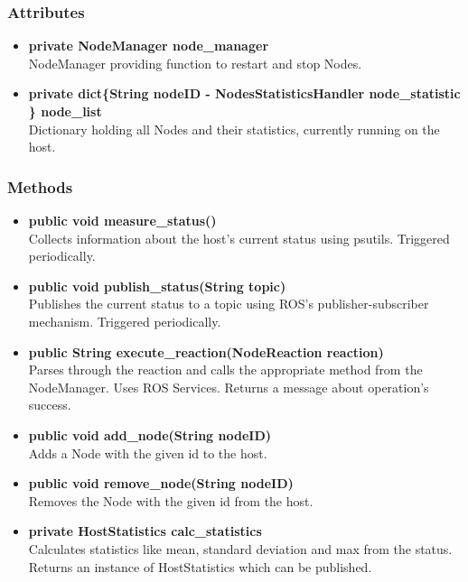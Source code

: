 \subsubsection{Attributes}
\begin{itemize}
	\item \textbf{private NodeManager node\_manager}\\
			NodeManager providing function to restart and stop Nodes.
	\item \textbf{private  dict\{String nodeID  - NodesStatisticsHandler node\_statistic  \} node\_list}\\
			Dictionary holding all Nodes and their statistics, currently running on the host.
\end{itemize}

\subsubsection{Methods}
\begin{itemize}
	\item \textbf{public void measure\_status()}\\
			Collects information about the host's current status using psutils.
			Triggered periodically.
	\item \textbf{public void publish\_status(String topic)}\\
			Publishes the current status to a topic using ROS's publisher-subscriber mechanism.
			Triggered periodically.
	\item \textbf{public String execute\_reaction(NodeReaction reaction)}\\
			Parses through the reaction and calls the appropriate method from the NodeManager. Uses ROS Services.
			Returns a message about operation's success.
	\item \textbf{public void add\_node(String nodeID)}\\
			Adds a Node with the given id to the host.
	\item \textbf{public void remove\_node(String nodeID)}\\
			Removes the Node with the given id from the host.
	\item \textbf{private HostStatistics calc\_statistics}\\
			Calculates statistics like mean, standard deviation and max from the status.
			Returns an instance of HostStatistics which can be published.
\end{itemize}


